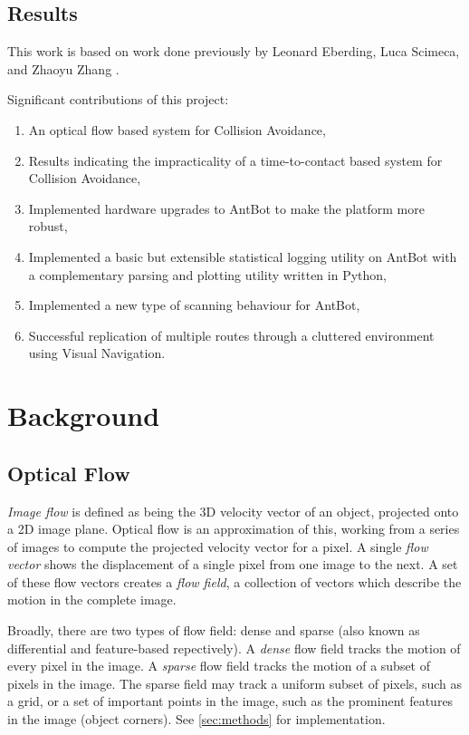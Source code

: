 \documentclass[a4paper,11pt,twoside,openright]{article}
\let\oldsection\section
\def\section{\cleardoublepage\oldsection}
\begin{document}
\subsection { Results }
This work is based on work done previously by Leonard Eberding, Luca Scimeca, and Zhaoyu Zhang
\cite{Eberding2016, Scimeca2017, Zhang2017}.
\newline

Significant contributions of this project:
\begin{enumerate}
  \item{An optical flow based system for Collision Avoidance,}
  \item{Results indicating the impracticality of a time-to-contact based system for Collision Avoidance,}
  \item{Implemented hardware upgrades to AntBot to make the platform more robust,}
  \item{Implemented a basic but extensible statistical logging utility on AntBot with a complementary parsing and plotting utility written in Python,} 
  \item{Implemented a new type of scanning behaviour for AntBot,}
  \item{Successful replication of multiple routes through a cluttered environment using Visual Navigation.}
  \end{enumerate}
\newpage

\section{ Background}
\subsection{ Optical Flow }
\textit{Image flow} is defined as being the 3D velocity vector of an object, projected onto a
2D image plane\cite{ODonovan2005}. Optical flow is an approximation of this, working from a series
of images to compute the projected velocity vector for a pixel. A single \textit{flow vector}
shows the displacement of a single pixel from one image to the next. A set of these flow vectors
creates a \textit{flow field}, a collection of vectors which describe the motion in the complete image.
\newline

Broadly, there are two types of flow field: dense and sparse (also known as differential and
feature-based repectively\cite{Low2005}). A \textit{dense} flow field tracks
the motion of every pixel in the image. A \textit{sparse} flow field tracks the motion of a subset
of pixels in the image. The sparse field may track a uniform subset of pixels, such as a grid, or a
set of important points in the image, such as the prominent features in the image (object corners).
See \ref{sec:methods} for implementation.
\end{document}
